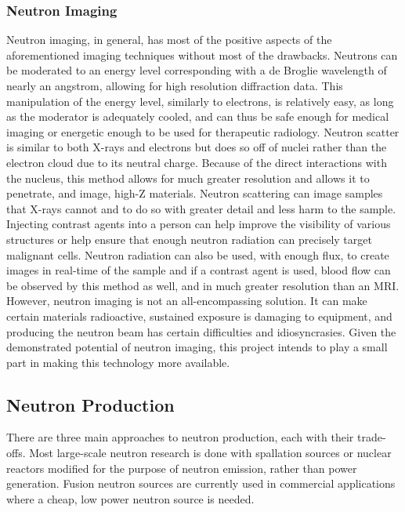 \subsubsection{Neutron Imaging}

Neutron imaging, in general, has most of the positive aspects of the aforementioned imaging techniques without most of the drawbacks. Neutrons can be moderated to an energy level corresponding with a de Broglie wavelength of nearly an angstrom, allowing for high resolution diffraction data. This manipulation of the energy level, similarly to electrons, is relatively easy, as long as the moderator is adequately cooled, and can thus be safe enough for medical imaging or energetic enough to be used for therapeutic radiology. Neutron scatter is similar to both X-rays and electrons but does so off of nuclei rather than the electron cloud due to its neutral charge. Because of the direct interactions with the nucleus, this method allows for much greater resolution and allows it to penetrate, and image, high-Z materials. Neutron scattering can image samples that X-rays cannot and to do so with greater detail and less harm to the sample. Injecting contrast agents into a person can help improve the visibility of various structures or help ensure that enough neutron radiation can precisely target malignant cells. Neutron radiation can also be used, with enough flux, to create images in real-time of the sample and if a contrast agent is used, blood flow can be observed by this method as well, and in much greater resolution than an MRI. However, neutron imaging is not an all-encompassing solution. It can make certain materials radioactive, sustained exposure is damaging to equipment, and producing the neutron beam has certain difficulties and idiosyncrasies. Given the demonstrated potential of neutron imaging, this project intends to play a small part in making this technology more available.

\subsection{Neutron Production}

There are three main approaches to neutron production, each with their trade-offs. Most large-scale neutron research is done with spallation sources or nuclear reactors modified for the purpose of neutron emission, rather than power generation. Fusion neutron sources are currently used in commercial applications where a cheap, low power neutron source is needed.

